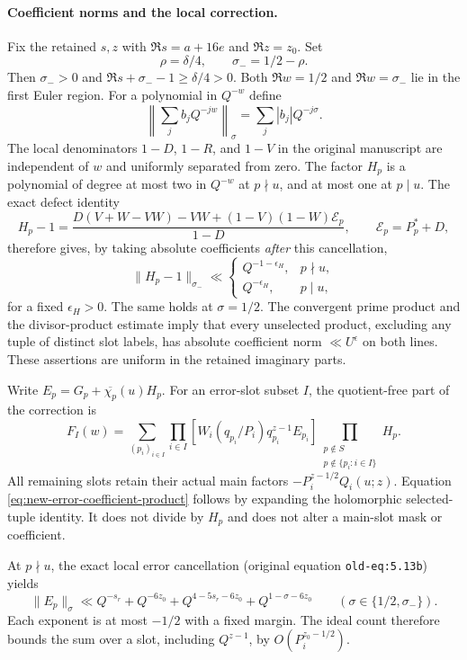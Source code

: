 \paragraph{Coefficient norms and the local correction.}
Fix the retained $s,z$ with $\Re s=a+16e$ and $\Re z=z_0$.
Set
\[
 \rho=\delta/4,\qquad \sigma_-=1/2-\rho.
\]
Then $\sigma_->0$ and
$\Re s+\sigma_--1\ge\delta/4>0$.  Both $\Re w=1/2$ and
$\Re w=\sigma_-$ lie in the first Euler region.  For a polynomial in
$Q^{-w}$ define
\[
 \left\|\sum_j b_jQ^{-jw}\right\|_\sigma
       =\sum_j|b_j|Q^{-j\sigma}.
\]
The local denominators $1-D$, $1-R$, and $1-V$ in the original
manuscript are independent of $w$ and uniformly separated from zero.
The factor $H_p$ is a polynomial of degree at most two in $Q^{-w}$ at
$p\nmid u$, and at most one at $p\mid u$.  The exact defect identity
\[
 H_p-1=
 \frac{D(V+W-VW)-VW+(1-V)(1-W)\mathcal E_p}{1-D},
 \qquad \mathcal E_p=P_p^*+D,
\]
therefore gives, by taking absolute coefficients \emph{after} this
cancellation,
\[
 \|H_p-1\|_{\sigma_-}\ll
 \begin{cases}
 Q^{-1-\epsilon_H},&p\nmid u,\\
 Q^{-\epsilon_H},&p\mid u,
 \end{cases}
\]
for a fixed $\epsilon_H>0$.  The same holds at $\sigma=1/2$.
The convergent prime product and the divisor-product estimate imply
that every unselected product, excluding any tuple of distinct slot
labels, has absolute coefficient norm $\ll U^\epsilon$ on both lines.
These assertions are uniform in the retained imaginary parts.

Write
$E_p=G_p+\overline{\chi_p}(u)H_p$.  For an error-slot subset $I$,
the quotient-free part of the correction is
\begin{equation}\label{eq:new-error-coefficient-product}
 F_I(w)=\sum_{(p_i)_{i\in I}}
 \prod_{i\in I}\left[
 W_i(q_{p_i}/P_i)q_{p_i}^{z-1}E_{p_i}\right]
 \prod_{\substack{p\notin S\\p\notin\{p_i:i\in I\}}}H_p.
\end{equation}
All remaining slots retain their actual main factors
$-P_i^{z-1/2}Q_i(u;z)$.  Equation
\eqref{eq:new-error-coefficient-product} follows by expanding the
holomorphic selected-tuple identity.  It does not divide by $H_p$ and
does not alter a main-slot mask or coefficient.

At $p\nmid u$, the exact local error cancellation
\textup{(original equation \texttt{old-eq:5.13b})} yields
\[
 \|E_p\|_\sigma\ll
 Q^{-s_r}+Q^{-6z_0}+Q^{4-5s_r-6z_0}+Q^{1-\sigma-6z_0}
 \qquad(\sigma\in\{1/2,\sigma_-\}).
\]
Each exponent is at most $-1/2$ with a fixed margin.  The ideal count
therefore bounds the sum over a slot, including $Q^{z-1}$, by
$O(P_i^{z_0-1/2})$.

